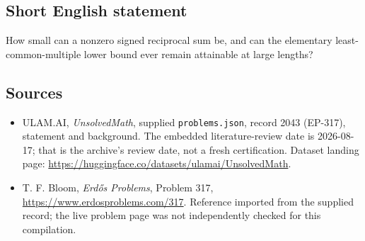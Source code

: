 \documentclass[11pt,a4paper]{article}
\begin{document}
\subsection{Short English statement}

How small can a nonzero signed reciprocal sum be, and can the elementary least-common-multiple lower bound ever remain attainable at large lengths?

\subsection{Sources}

{\small

\begin{itemize}

\item[\hypertarget{source:2043:1}{S1}] ULAM.AI, \emph{UnsolvedMath}, supplied \texttt{problems.json}, record 2043 (EP-317), statement and background. The embedded literature-review date is 2026-08-17; that is the archive’s review date, not a fresh certification. Dataset landing page: \url{https://huggingface.co/datasets/ulamai/UnsolvedMath}.

\item[\hypertarget{source:2043:2}{S2}] T. F. Bloom, \emph{Erdős Problems}, Problem 317, \url{https://www.erdosproblems.com/317}. Reference imported from the supplied record; the live problem page was not independently checked for this compilation.

\end{itemize}

}

\label{end:2043}
\end{document}
